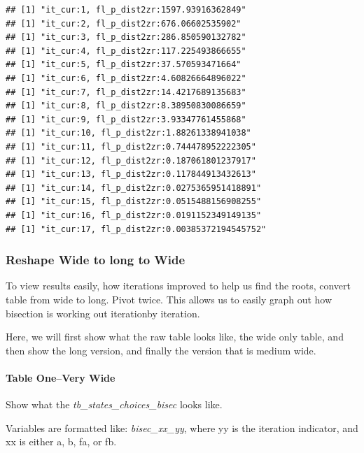 \documentclass[
]{book}
\newenvironment{Shaded}{\begin{snugshade}}{\end{snugshade}}
\newcommand{\DecValTok}[1]{\textcolor[rgb]{0.00,0.00,0.81}{#1}}
\newcommand{\KeywordTok}[1]{\textcolor[rgb]{0.13,0.29,0.53}{\textbf{#1}}}
\newcommand{\NormalTok}[1]{#1}
\newcommand{\OperatorTok}[1]{\textcolor[rgb]{0.81,0.36,0.00}{\textbf{#1}}}
\newcommand{\StringTok}[1]{\textcolor[rgb]{0.31,0.60,0.02}{#1}}
\begin{document}
\begin{verbatim}
## [1] "it_cur:1, fl_p_dist2zr:1597.93916362849"
## [1] "it_cur:2, fl_p_dist2zr:676.06602535902"
## [1] "it_cur:3, fl_p_dist2zr:286.850590132782"
## [1] "it_cur:4, fl_p_dist2zr:117.225493866655"
## [1] "it_cur:5, fl_p_dist2zr:37.570593471664"
## [1] "it_cur:6, fl_p_dist2zr:4.60826664896022"
## [1] "it_cur:7, fl_p_dist2zr:14.4217689135683"
## [1] "it_cur:8, fl_p_dist2zr:8.38950830086659"
## [1] "it_cur:9, fl_p_dist2zr:3.93347761455868"
## [1] "it_cur:10, fl_p_dist2zr:1.88261338941038"
## [1] "it_cur:11, fl_p_dist2zr:0.744478952222305"
## [1] "it_cur:12, fl_p_dist2zr:0.187061801237917"
## [1] "it_cur:13, fl_p_dist2zr:0.117844913432613"
## [1] "it_cur:14, fl_p_dist2zr:0.0275365951418891"
## [1] "it_cur:15, fl_p_dist2zr:0.0515488156908255"
## [1] "it_cur:16, fl_p_dist2zr:0.0191152349149135"
## [1] "it_cur:17, fl_p_dist2zr:0.00385372194545752"
\end{verbatim}

\hypertarget{reshape-wide-to-long-to-wide}{%
\subsubsection{Reshape Wide to long to Wide}\label{reshape-wide-to-long-to-wide}}

To view results easily, how iterations improved to help us find the roots, convert table from wide to long. Pivot twice. This allows us to easily graph out how bisection is working out iterationby iteration.

Here, we will first show what the raw table looks like, the wide only table, and then show the long version, and finally the version that is medium wide.

\hypertarget{table-onevery-wide}{%
\paragraph{Table One--Very Wide}\label{table-onevery-wide}}

Show what the \emph{tb\_states\_choices\_bisec} looks like.

Variables are formatted like: \emph{bisec\_xx\_yy}, where yy is the iteration indicator, and xx is either a, b, fa, or fb.

\begin{Shaded}
\end{Shaded}
\end{document}
